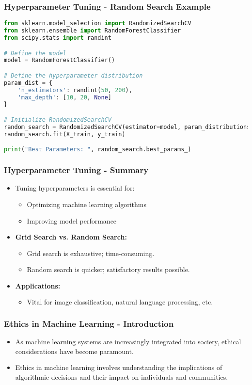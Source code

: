 \documentclass[aspectratio=169]{beamer}
\begin{document}
\begin{frame}[fragile]
    \frametitle{Hyperparameter Tuning - Random Search Example}
    \begin{lstlisting}[language=Python]
from sklearn.model_selection import RandomizedSearchCV
from sklearn.ensemble import RandomForestClassifier
from scipy.stats import randint

# Define the model
model = RandomForestClassifier()

# Define the hyperparameter distribution
param_dist = {
    'n_estimators': randint(50, 200),
    'max_depth': [10, 20, None]
}

# Initialize RandomizedSearchCV
random_search = RandomizedSearchCV(estimator=model, param_distributions=param_dist, n_iter=20, scoring='accuracy', cv=5)
random_search.fit(X_train, y_train)

print("Best Parameters: ", random_search.best_params_)
    \end{lstlisting}
\end{frame}

\begin{frame}[fragile]
    \frametitle{Hyperparameter Tuning - Summary}
    \begin{itemize}
        \item Tuning hyperparameters is essential for:
        \begin{itemize}
            \item Optimizing machine learning algorithms
            \item Improving model performance
        \end{itemize}
        \item \textbf{Grid Search vs. Random Search:}
        \begin{itemize}
            \item Grid search is exhaustive; time-consuming.
            \item Random search is quicker; satisfactory results possible.
        \end{itemize}
        \item \textbf{Applications:}
        \begin{itemize}
            \item Vital for image classification, natural language processing, etc.
        \end{itemize}
    \end{itemize}
\end{frame}

\begin{frame}[fragile]
    \frametitle{Ethics in Machine Learning - Introduction}
    \begin{itemize}
        \item As machine learning systems are increasingly integrated into society, ethical considerations have become paramount.
        \item Ethics in machine learning involves understanding the implications of algorithmic decisions and their impact on individuals and communities.
    \end{itemize}
\end{frame}
\end{document}
